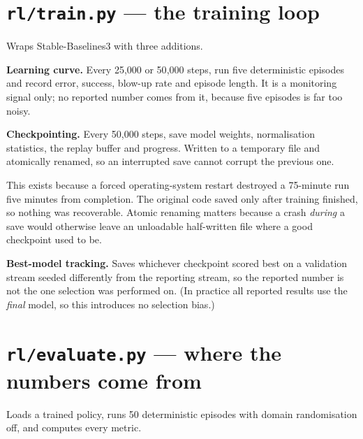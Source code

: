 \section{\texttt{rl/train.py} --- the training loop}

Wraps Stable-Baselines3 with three additions.

\textbf{Learning curve.} Every 25{,}000 or 50{,}000 steps, run five deterministic
episodes and record error, success, blow-up rate and episode length. It is a
monitoring signal only; no reported number comes from it, because five episodes
is far too noisy.

\textbf{Checkpointing.} Every 50{,}000 steps, save model weights, normalisation
statistics, the replay buffer and progress. Written to a temporary file and
atomically renamed, so an interrupted save cannot corrupt the previous one.

\begin{trap}
This exists because a forced operating-system restart destroyed a 75-minute run
five minutes from completion. The original code saved only after training
finished, so nothing was recoverable. Atomic renaming matters because a crash
\emph{during} a save would otherwise leave an unloadable half-written file where
a good checkpoint used to be.
\end{trap}

\textbf{Best-model tracking.} Saves whichever checkpoint scored best on a
validation stream seeded differently from the reporting stream, so the reported
number is not the one selection was performed on. (In practice all reported
results use the \emph{final} model, so this introduces no selection bias.)

\section{\texttt{rl/evaluate.py} --- where the numbers come from}

Loads a trained policy, runs 50 deterministic episodes with domain randomisation
off, and computes every metric.

